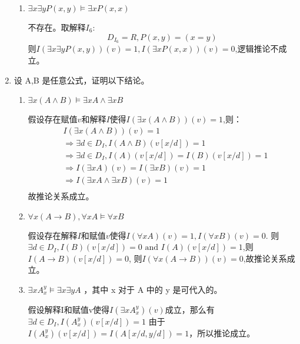 \documentclass[UTF8]{ctexart}
\begin{document}
\begin{enumerate}
\begin{enumerate}
            \item $\exists x\exists yP(x, y) \models  \exists xP(x, x)$
            
            不存在。取解释$I_6$:
            \[
                D_{I_6}=R,P(x,y)=(x=y)
            \]
            则$I(\exists x\exists yP(x,y))(v)=1,I(\exists xP(x,x))(v)=0$,逻辑推论不成立。
            
        \end{enumerate}
        
        \item 设 A,B 是任意公式，证明以下结论。
        \begin{enumerate}
            \item $\exists x( A \wedge  B) \models  \exists xA \wedge  \exists xB$
            
            假设存在赋值$v$和解释$I$使得$I(\exists x(A\wedge B))(v)=1$,则：
            \[
                \begin{aligned}
                    &I(\exists x(A\wedge B))(v)=1\\
                    &\Rightarrow \exists d\in D_I,I(A\wedge B)(v[x/d])=1\\
                    &\Rightarrow \exists d\in D_I,I(A)(v[x/d])=I(B)(v[x/d])=1\\
                    &\Rightarrow I(\exists x A)(v)=I(\exists xB)(v)=1\\
                    &\Rightarrow I(\exists x A\wedge \exists xB)(v)=1\\
                \end{aligned}
            \]
            故推论关系成立。

            \item $\forall x( A \rightarrow  B), \forall xA \models  \forall xB$
            
            假设存在解释$I$和赋值$v$使得$I(\forall xA)(v)=1,I(\forall xB)(v)=0$.
            则$\exists d\in D_I,I(B)(v[x/d])=0 \text{ and } I(A)(v[x/d])=1$,则$I(A\rightarrow B)(v[x/d])=0$,
            则$I(\forall x(A\rightarrow B))(v)=0$,故推论关系成立。
            
            \item  $\exists x A_x^y \models  \exists x\exists y A$ ，其中 x 对于 A 中的 y 是可代入的。
            
            假设解释I和赋值v使得$I(\exists x A_x^y)(v)$成立，那么有$\exists d\in D_I,I(A_x^y)(v[x/d])=1$
            由于$I(A_x^y)(v[x/d])=I(A[x/d,y/d])=1$，所以推论成立。
            

\end{enumerate}
\end{enumerate}
\end{document}
